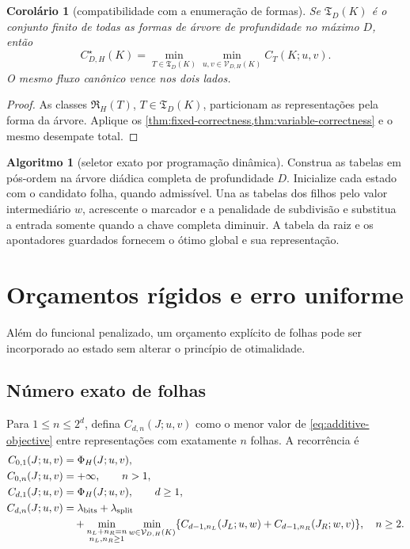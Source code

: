 \documentclass[11pt,a4paper]{article}
\newtheorem{corollary}[theorem]{Corolário}
\theoremstyle{definition}
\newtheorem{algorithm}[theorem]{Algoritmo}
\theoremstyle{remark}
\newcommand{\Representations}{\mathfrak{R}}
\newcommand{\Trees}{\mathfrak{T}}
\newcommand{\Values}{\mathcal{V}}
\begin{document}
\begin{corollary}[compatibilidade com a enumeração de formas]
\label{cor:shape-enumeration}
Se $\Trees_D(K)$ é o conjunto finito de todas as formas de árvore de
profundidade no máximo $D$, então
\begin{equation}
 C_{D,H}^{\star}(K)
 =\min_{T\in\Trees_D(K)}
   \min_{u,v\in\Values_{D,H}(K)}C_T(K;u,v).
 \label{eq:shape-equivalence}
\end{equation}
O mesmo fluxo canônico vence nos dois lados.
\end{corollary}

\begin{proof}
As classes $\Representations_H(T)$, $T\in\Trees_D(K)$, particionam as
representações pela forma da árvore. Aplique os
\cref{thm:fixed-correctness,thm:variable-correctness} e o mesmo desempate
total.
\end{proof}

\begin{algorithm}[seletor exato por programação dinâmica]
\label{alg:variable-tree}
Construa as tabelas em pós-ordem na árvore diádica completa de profundidade
$D$. Inicialize cada estado com o candidato folha, quando admissível. Una as
tabelas dos filhos pelo valor intermediário $w$, acrescente o marcador e a
penalidade de subdivisão e substitua a entrada somente quando a chave completa
diminuir. A tabela da raiz e os apontadores guardados fornecem o ótimo global
e sua representação.
\end{algorithm}

\section{Orçamentos rígidos e erro uniforme}
\label{sec:hard-budgets}

Além do funcional penalizado, um orçamento explícito de folhas pode ser
incorporado ao estado sem alterar o princípio de otimalidade.

\subsection{Número exato de folhas}

Para $1\le n\le2^d$, defina $C_{d,n}(J;u,v)$ como o menor valor de
\eqref{eq:additive-objective} entre representações com exatamente $n$ folhas.
A recorrência é
\begin{align}
 C_{0,1}(J;u,v)&=\Phi_H(J;u,v),\label{eq:budget-base}\\
 C_{0,n}(J;u,v)&=+\infty,\qquad n>1,\notag\\
 C_{d,1}(J;u,v)&=\Phi_H(J;u,v),\qquad d\ge1,\label{eq:budget-one}\\
 C_{d,n}(J;u,v)&=\lambda_{\rm bits}+\lambda_{\rm split}\notag\\
 &\quad+\min_{\substack{n_L+n_R=n\\n_L,n_R\ge1}}
 \min_{w\in\Values_{D,H}(K)}
 \{C_{d-1,n_L}(J_L;u,w)+C_{d-1,n_R}(J_R;w,v)\},
 \quad n\ge2.
 \label{eq:budget-recurrence}
\end{align}
\end{document}

